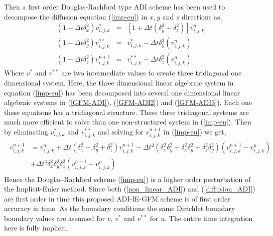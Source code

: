 Then a first order Douglas-Rachford type ADI scheme has been used to decompose the diffusion equation (\ref{imp-eu}) in $x,y$ and $z$ directions as,  
\begin{eqnarray}
		\left(1- \Delta t \delta_x^2\right)v_{i,j,k}^{*}&=&\left[1+ \Delta t \left(\delta_y^2+\delta_z^2 \right)\right]v_{i,j,k}^{n}\label{GFM-ADI}\\
		\left(1-\Delta t \delta_y^2\right)v_{i,j,k}^{**}&=&v_{i,j,k}^{*}- \Delta t \delta_y^2\left(v_{i,j,k}^{n}\right)\label{GFM-ADI2}\\
		\left(1- \Delta t \delta_z^2\right)v_{i,j,k}^{n+1}&=&v_{i,j,k}^{**}- \Delta t \delta_z^2\left(v_{i,j,k}^{n}\right)\label{GFM-ADI3}
\end{eqnarray} 
Where $v^*$ and $v^{**}$ are two intermediate values to create three tridiagonal one dimensional system. Here, the three dimensional linear algebraic system in equation (\ref{imp-eu}) has been decomposed into several one dimensional linear algebraic systems in (\ref{GFM-ADI}), (\ref{GFM-ADI2}) and (\ref{GFM-ADI3}).  Each one these equations has a tridiagonal structure. These three tridiagonal systems are much more efficient to solve than one non-structured system in (\ref{imp-eu}). Then by eliminating $v^*_{i,j,k}$ and $v^{**}_{i,j,k}$ and solving for $v^{n+1}_{i,j,k}$ in (\ref{imp-eu}) we get,
\begin{eqnarray}
\begin{aligned}
	v^{n+1}_{i,j,k}&=v^n_{i,j,k}+ \Delta t \left(\delta_x^2+\delta_y^2+\delta_z^2\right) v^{n+1}_{i,j,k} -\Delta t^2 \left(\delta_x^2\delta_y^2+\delta_x^2\delta_y^2+\delta_z^2\delta_y^2\right)(v^{n+1}_{i,j,k}-v^{n}_{i,j,k})\\
	&+ \Delta t^3 \delta_x^2\delta_y^2\delta_z^2(v^{n+1}_{i,j,k}-v^{n}_{i,j,k}) \label{adi_tailor}
	\end{aligned}
\end{eqnarray}
Hence the Douglas-Rachford scheme (\ref{imp-eu}) is a higher order perturbation of the Implicit-Euler method. Since both (\ref{non_linear_ADI}) and (\ref{diffusion_ADI}) are first order in time this proposed ADI-IE-GFM scheme is of first order accuracy in time. As the boundary conditions the same Dirichlet boundary boundary values are assumed for $v$, $v^*$ and  $v^{**}$ for $u$. The entire time integration here is fully implicit. 


